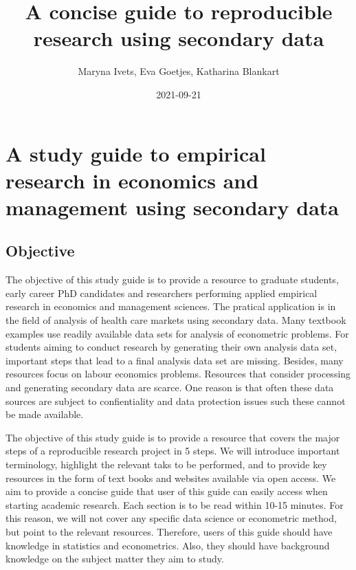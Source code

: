 \documentclass[
]{book}
\title{A concise guide to reproducible research using secondary data}
\author{Maryna Ivets, Eva Goetjes, Katharina Blankart}
\date{2021-09-21}
\begin{document}
\frontmatter
\maketitle

\mainmatter
\hypertarget{a-study-guide-to-empirical-research-in-economics-and-management-using-secondary-data}{%
\chapter*{A study guide to empirical research in economics and
management using secondary
data}\label{a-study-guide-to-empirical-research-in-economics-and-management-using-secondary-data}}

\hypertarget{objective}{%
\section*{Objective}\label{objective}}

The objective of this study guide is to provide a resource to graduate
students, early career PhD candidates and researchers performing applied
empirical research in economics and management sciences. The pratical
application is in the field of analysis of health care markets using
secondary data. Many textbook examples use readily available data sets
for analysis of econometric problems. For students aiming to conduct
research by generating their own analysis data set, important steps that
lead to a final analysis data set are missing. Besides, many resources
focus on labour economics problems. Resources that consider processing
and generating secondary data are scarce. One reason is that often these
data sources are subject to confientiality and data protection issues
such these cannot be made available.

The objective of this study guide is to provide a resource that covers
the major steps of a reproducible research project in 5 steps. We will
introduce important terminology, highlight the relevant taks to be
performed, and to provide key resources in the form of text books and
websites available via open access. We aim to provide a concise guide
that user of this guide can easily access when starting academic
research. Each section is to be read within 10-15 minutes. For this
reason, we will not cover any specific data science or econometric
method, but point to the relevant resources. Therefore, users of this
guide should have knowledge in statistics and econometrics. Also, they
should have background knowledge on the subject matter they aim to
study.
\end{document}
